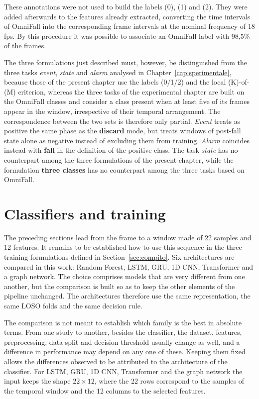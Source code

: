 These annotations were not used to build the labels (0), (1) and (2). They were added afterwards to the features already extracted, converting the time intervals of OmniFall into the corresponding frame intervals at the nominal frequency of 18 fps. By this procedure it was possible to associate an OmniFall label with 98,5\% of the frames.

The three formulations just described must, however, be distinguished from the three tasks \emph{event}, \emph{state} and \emph{alarm} analysed in Chapter~\ref{cap:sperimentale}, because those of the present chapter use the labels (0/1/2) and the local (K)-of-(M) criterion, whereas the three tasks of the experimental chapter are built on the OmniFall classes and consider a class present when at least five of its frames appear in the window, irrespective of their temporal arrangement. The correspondence between the two sets is therefore only partial. \emph{Event} treats as positive the same phase as the \textbf{discard} mode, but treats windows of post-fall state alone as negative instead of excluding them from training. \emph{Alarm} coincides instead with \textbf{fall} in the definition of the positive class. The task \emph{state} has no counterpart among the three formulations of the present chapter, while the formulation \textbf{three classes} has no counterpart among the three tasks based on OmniFall.

\section{Classifiers and training}
\label{sec:classificatori}

The preceding sections lead from the frame to a window made of 22 samples and 12 features. It remains to be established how to use this sequence in the three training formulations defined in Section~\ref{sec:compito}.
Six architectures are compared in this work: Random Forest, LSTM, GRU, 1D CNN, Transformer and a graph network. The choice comprises models that are very different from one another, but the comparison is built so as to keep the other elements of the pipeline unchanged. The architectures therefore use the same representation, the same LOSO folds and the same decision rule.

The comparison is not meant to establish which family is the best in absolute terms. From one study to another, besides the classifier, the dataset, features, preprocessing, data split and decision threshold usually change as well, and a difference in performance may depend on any one of these. Keeping them fixed allows the differences observed to be attributed to the architecture of the classifier. For LSTM, GRU, 1D CNN, Transformer and the graph network the input keeps the shape $22 \times 12$, where the 22 rows correspond to the samples of the temporal window and the 12 columns to the selected features.

